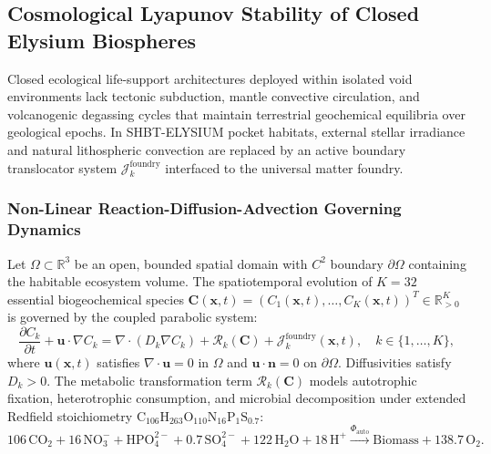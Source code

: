 \documentclass[11pt,onecolumn]{article}
\begin{document}
\subsection{Cosmological Lyapunov Stability of Closed Elysium Biospheres}
\label{sec:swarm_bio_lyapunov}

Closed ecological life-support architectures deployed within isolated void environments lack tectonic subduction, mantle convective circulation, and volcanogenic degassing cycles that maintain terrestrial geochemical equilibria over geological epochs. In SHBT-ELYSIUM pocket habitats, external stellar irradiance and natural lithospheric convection are replaced by an active boundary translocator system $\mathcal{J}_k^{\mathrm{foundry}}$ interfaced to the universal matter foundry.

\subsubsection{Non-Linear Reaction-Diffusion-Advection Governing Dynamics}
Let $\Omega \subset \mathbb{R}^3$ be an open, bounded spatial domain with $C^2$ boundary $\partial\Omega$ containing the habitable ecosystem volume. The spatiotemporal evolution of $K = 32$ essential biogeochemical species $\mathbf{C}(\mathbf{x}, t) = (C_1(\mathbf{x}, t), \dots, C_K(\mathbf{x}, t))^T \in \mathbb{R}_{>0}^K$ is governed by the coupled parabolic system:
\begin{equation}
\label{eq:pde_transport_system}
\frac{\partial C_k}{\partial t} + \mathbf{u} \cdot \nabla C_k = \nabla \cdot (D_k \nabla C_k) + \mathcal{R}_k(\mathbf{C}) + \mathcal{J}_k^{\mathrm{foundry}}(\mathbf{x}, t), \quad k \in \{1, \dots, K\},
\end{equation}
where $\mathbf{u}(\mathbf{x}, t)$ satisfies $\nabla \cdot \mathbf{u} = 0$ in $\Omega$ and $\mathbf{u} \cdot \mathbf{n} = 0$ on $\partial\Omega$. Diffusivities satisfy $D_k > 0$. The metabolic transformation term $\mathcal{R}_k(\mathbf{C})$ models autotrophic fixation, heterotrophic consumption, and microbial decomposition under extended Redfield stoichiometry $\mathrm{C}_{106}\mathrm{H}_{263}\mathrm{O}_{110}\mathrm{N}_{16}\mathrm{P}_1\mathrm{S}_{0.7}$:
\begin{equation}
\label{eq:redfield_stoich_balance}
106\,\mathrm{CO}_2 + 16\,\mathrm{NO}_3^- + \mathrm{HPO}_4^{2-} + 0.7\,\mathrm{SO}_4^{2-} + 122\,\mathrm{H}_2\mathrm{O} + 18\,\mathrm{H}^+ \xrightarrow{\Phi_{\mathrm{auto}}} \mathrm{Biomass} + 138.7\,\mathrm{O}_2.
\end{equation}
\end{document}
